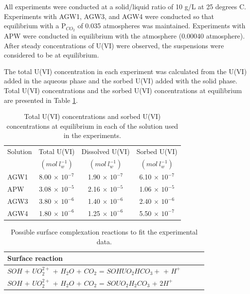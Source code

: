 All experiments were conducted at a solid/liquid ratio of 10 g/L at 
25 degrees C. Experiments with AGW1, AGW3, and AGW4 were conducted 
so that equilibrium with a P$_{CO_2}$ of 0.035 atmospheres was maintained.  
Experiments with APW were conducted in equilibrium with the 
atmosphere (0.00040 atmosphere).  
After steady concentrations of U(VI) were observed, 
the suspensions were considered to be at equilibrium.

The total U(VI) concentration in each experiment was calculated from the U(VI) 
added in the aqueous phase and the sorbed U(VI) added with the solid phase.  
Total U(VI) concentrations and the sorbed U(VI) concentrations 
at equilibrium are presented in Table \ref{ex_u_scm2}.

\begin{table}[h]
\caption{Total U(VI) concentrations and sorbed U(VI) concentrations 
at equilibrium in each of the solution used in the experiments.}
\begin{center}
\begin{tabular}{l c c c}
\hline
 Solution                & Total U(VI)              & Dissolved U(VI)         & Sorbed U(VI)        \\
                         & $(mol\ l^{-1}_w)$        & $(mol\ l^{-1}_w)$       & $(mol\ l^{-1}_w)$   \\ \hline
 AGW1                    & 8.00 $\times$ $10^{-7}$  & 1.90 $\times$ $10^{-7}$ & 6.10 $\times$ $10^{-7}$ & \\
 APW                     & 3.08 $\times$ $10^{-5}$  & 2.16 $\times$ $10^{-5}$ & 1.06 $\times$ $10^{-5}$ & \\ 
 AGW3                    & 3.80 $\times$ $10^{-6}$  & 1.40 $\times$ $10^{-6}$ & 2.40 $\times$ $10^{-6}$ & \\
 AGW4                    & 1.80 $\times$ $10^{-6}$  & 1.25 $\times$ $10^{-6}$ & 5.50 $\times$ $10^{-7}$ & \\ \hline
\end{tabular}
\label{ex_u_scm2}
\end{center}
\end{table}

\begin{table}[h]
\caption{Possible surface complexation reactions to fit the experimental data.}
\begin{center}
\begin{tabular}{l c c c}
\hline
 Surface reaction           \\ \hline
 $SOH$ + $UO_2^{2+}$ + $H_2O$ + $CO_2$ = $SOHUO_2HCO_3+$ + $H^+$  \\
 $SOH$ + $UO_2^{2+}$ + $H_2O$ + $CO_2$ = $SOUO_2H_2CO_3$ + $2H^+$  \\ \hline
\end{tabular}
\label{ex_u_scm3}
\end{center}
\end{table}

